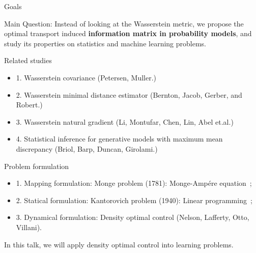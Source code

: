 \documentclass{beamer}
\begin{document}
\begin{frame}{Goals}
\vspace{0cm}
\begin{block}{Main Question:}
Instead of looking at the Wasserstein metric, we propose the optimal transport induced \textbf{information matrix in probability models}, and study its properties on statistics and machine learning problems.
\end{block}

\begin{block}{Related studies}
\begin{itemize} 
\item 1. Wasserstein covariance (Petersen, Muller.)
\item 2. Wasserstein minimal distance estimator (Bernton, Jacob, Gerber, and Robert.)
\item 3. Wasserstein natural gradient (Li, Montufar, Chen, Lin, Abel et.al.)
\item 4. Statistical inference for generative models with maximum mean discrepancy (Briol, Barp, Duncan, Girolami.)
\end{itemize}
\end{block}
\end{frame}
\begin{frame}{Problem formulation}
\begin{itemize}
\item 1. Mapping formulation: Monge problem (1781): Monge-Amp{\' e}re equation\ ;
\item 2. Statical formulation:  Kantorovich problem (1940): Linear programming\ ;
\item 3. Dynamical formulation: {\color{blue}Density optimal control} (Nelson, Lafferty, Otto, Villani).
\end{itemize}
In this talk, we will apply {\color{blue}density optimal control} into learning problems.
\end{frame}
\end{document}

